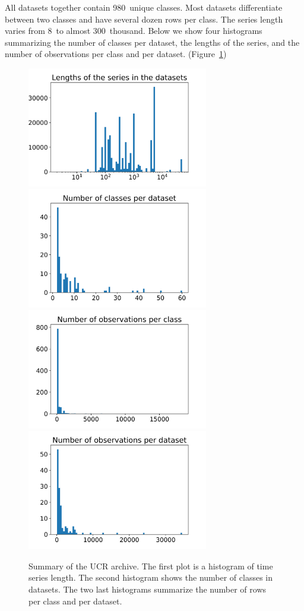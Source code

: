 \documentclass[a4paper,11pt,twoside]{report}
\theoremstyle{definition}
\begin{document}
All datasets together contain 980~unique classes. Most datasets differentiate between two classes and have several dozen rows per class. The series length varies from 8~to almost 300~thousand. Below we show four histograms summarizing the number of classes per dataset, the lengths of the series, and the number of observations per class and per dataset. (Figure~\ref{fig:histograms})
\begin{figure}[h!]
\centering
\includegraphics[width=7.9cm]{imgs/lengths_of_the_series_in_the_datasets.png}
\includegraphics[width=7.9cm]{imgs/number_of_classes_per_dataset.png}
\includegraphics[width=7.9cm]{imgs/number_of_observations_per_class.png}
\includegraphics[width=7.9cm]{imgs/number_of_observations_per_dataset.png}
\caption{Summary of the UCR archive. The first plot is a histogram of time series length. The second histogram shows the number of classes in datasets. The two last histograms summarize the number of rows per class and per dataset.}
\label{fig:histograms}
\end{figure}
\end{document}
